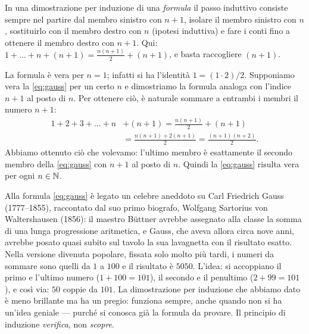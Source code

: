 \begin{schema}
\end{schema}

\begin{strategia}
In una dimostrazione per induzione di una \emph{formula} il passo induttivo consiste
sempre nel partire dal membro sinistro con $n+1$, isolare il membro sinistro con $n$,
sostituirlo con il membro destro con $n$ (ipotesi induttiva) e fare i conti fino a
ottenere il membro destro con $n+1$. Qui: $1+\dots+n+(n+1)=\frac{n(n+1)}{2}+(n+1)$, e
basta raccogliere $(n+1)$.
\end{strategia}

\begin{dimostrazione}
La formula è vera per $n=1$; infatti si ha l'identità $1=(1\cdot2)/2$. Supponiamo vera
la \eqref{eq:gauss} per un certo $n$ e dimostriamo la formula analoga con l'indice
$n+1$ al posto di $n$. Per ottenere ciò, è naturale sommare a entrambi i membri il
numero $n+1$:
\begin{equation}\label{eq:gauss-passo}
\begin{split}
  1+2+3+\dots+n&+(n+1)=\frac{n(n+1)}{2}+(n+1)\\
  &=\frac{n(n+1)+2(n+1)}{2}=\frac{(n+1)(n+2)}{2}.
\end{split}
\end{equation}
Abbiamo ottenuto ciò che volevamo: l'ultimo membro è esattamente il secondo membro della
\eqref{eq:gauss} con $n+1$ al posto di $n$. Quindi la \eqref{eq:gauss} risulta vera per
ogni $n\in\mathbb{N}$.
\end{dimostrazione}

\begin{notastorica}
Alla formula \eqref{eq:gauss} è legato un celebre aneddoto su Carl Friedrich Gauss
(1777--1855), raccontato dal suo primo biografo, Wolfgang Sartorius von Waltershausen
(1856): il maestro Büttner avrebbe assegnato alla classe la somma di una lunga
progressione aritmetica, e Gauss, che aveva allora circa nove anni, avrebbe posato quasi
subito sul tavolo la sua lavagnetta con il risultato esatto. Nella versione divenuta
popolare, fissata solo molto più tardi, i numeri da sommare sono quelli da $1$ a $100$ e
il risultato è $5050$. L'idea: si
accoppiano il primo e l'ultimo numero ($1+100=101$), il secondo e il penultimo
($2+99=101$), e così via: $50$ coppie da $101$. La dimostrazione per induzione che
abbiamo dato è meno brillante ma ha un pregio: funziona sempre, anche quando non si ha
un'idea geniale --- purché si conosca già la formula da provare. Il principio di
induzione \emph{verifica}, non \emph{scopre}.
\end{notastorica}

